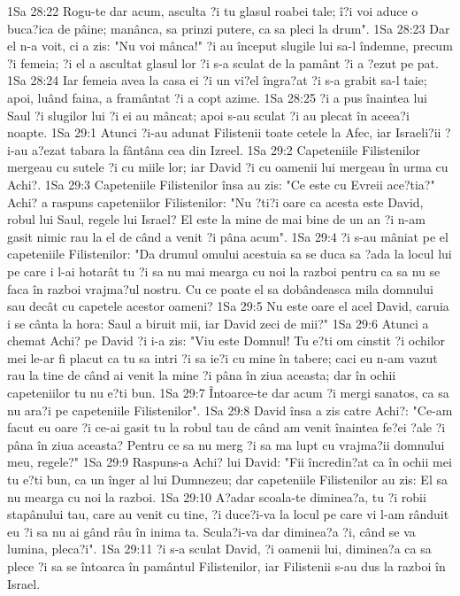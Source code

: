 1Sa 28:22  Rogu-te dar acum, asculta ?i tu glasul roabei tale; î?i voi aduce o buca?ica de pâine; manânca, sa prinzi putere, ca sa pleci la drum".
1Sa 28:23  Dar el n-a voit, ci a zis: "Nu voi mânca!" ?i au început slugile lui sa-l îndemne, precum ?i femeia; ?i el a ascultat glasul lor ?i s-a sculat de la pamânt ?i a ?ezut pe pat.
1Sa 28:24  Iar femeia avea la casa ei ?i un vi?el îngra?at ?i s-a grabit sa-l taie; apoi, luând faina, a framântat ?i a copt azime.
1Sa 28:25  ?i a pus înaintea lui Saul ?i slugilor lui ?i ei au mâncat; apoi s-au sculat ?i au plecat în aceea?i noapte.
1Sa 29:1  Atunci ?i-au adunat Filistenii toate cetele la Afec, iar Israeli?ii ?i-au a?ezat tabara la fântâna cea din Izreel.
1Sa 29:2  Capeteniile Filistenilor mergeau cu sutele ?i cu miile lor; iar David ?i cu oamenii lui mergeau în urma cu Achi?.
1Sa 29:3  Capeteniile Filistenilor însa au zis: "Ce este cu Evreii ace?tia?" Achi? a raspuns capeteniilor Filistenilor: "Nu ?ti?i oare ca acesta este David, robul lui Saul, regele lui Israel? El este la mine de mai bine de un an ?i n-am gasit nimic rau la el de când a venit ?i pâna acum".
1Sa 29:4  ?i s-au mâniat pe el capeteniile Filistenilor: "Da drumul omului acestuia sa se duca sa ?ada la locul lui pe care i l-ai hotarât tu ?i sa nu mai mearga cu noi la razboi pentru ca sa nu se faca în razboi vrajma?ul nostru. Cu ce poate el sa dobândeasca mila domnului sau decât cu capetele acestor oameni?
1Sa 29:5  Nu este oare el acel David, caruia i se cânta la hora: Saul a biruit mii, iar David zeci de mii?"
1Sa 29:6  Atunci a chemat Achi? pe David ?i i-a zis: "Viu este Domnul! Tu e?ti om cinstit ?i ochilor mei le-ar fi placut ca tu sa intri ?i sa ie?i cu mine în tabere; caci eu n-am vazut rau la tine de când ai venit la mine ?i pâna în ziua aceasta; dar în ochii capeteniilor tu nu e?ti bun.
1Sa 29:7  Întoarce-te dar acum ?i mergi sanatos, ca sa nu ara?i pe capeteniile Filistenilor".
1Sa 29:8  David însa a zis catre Achi?: "Ce-am facut eu oare ?i ce-ai gasit tu la robul tau de când am venit înaintea fe?ei ?ale ?i pâna în ziua aceasta? Pentru ce sa nu merg ?i sa ma lupt cu vrajma?ii domnului meu, regele?"
1Sa 29:9  Raspuns-a Achi? lui David: "Fii încredin?at ca în ochii mei tu e?ti bun, ca un înger al lui Dumnezeu; dar capeteniile Filistenilor au zis: El sa nu mearga cu noi la razboi.
1Sa 29:10  A?adar scoala-te diminea?a, tu ?i robii stapânului tau, care au venit cu tine, ?i duce?i-va la locul pe care vi l-am rânduit eu ?i sa nu ai gând râu în inima ta. Scula?i-va dar diminea?a ?i, când se va lumina, pleca?i".
1Sa 29:11  ?i s-a sculat David, ?i oamenii lui, diminea?a ca sa plece ?i sa se întoarca în pamântul Filistenilor, iar Filistenii s-au dus la razboi în Israel.
